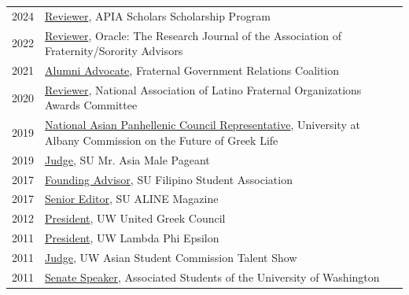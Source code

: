 \documentclass[12pt]{article}
\begin{document}
{\begin{longtable}{R{0.75in}p{5.0in}}
\footnotesize{2024} & \href{https://apiascholars.org/}{Reviewer}, APIA Scholars Scholarship Program\\

\footnotesize{2022} & \href{https://scholarworks.wm.edu/oracle/editorialboard.html}{Reviewer}, Oracle: The Research Journal of the Association of Fraternity/Sorority Advisors\\

\footnotesize{2021} & 
\href{http://www.fgrc.com/}{Alumni Advocate}, Fraternal Government Relations Coalition\\

\footnotesize{2020} & 
\href{https://nalfo.org/nalfo-awards/}{Reviewer}, National Association of Latino Fraternal Organizations Awards Committee\\

\footnotesize{2019} & 
\href{https://www.albany.edu/studentaffairs/commission_members.shtml}{National Asian Panhellenic Council Representative}, University at Albany Commission on the Future of Greek Life\\

\footnotesize{2019} & 
\href{https://ese.syr.edu/multicultural/calendar/asian-american-and-pacific-islander-heritage-month/}{Judge}, SU Mr. Asia Male Pageant\\

\footnotesize{2017} & 
 \href{https://www.facebook.com/syracusefsa/}{Founding Advisor}, SU Filipino Student Association\\

\footnotesize{2017} & \href{https://web.archive.org/web/20241207175640/https://issuu.com/alinemagazine}{Senior Editor}, SU ALINE Magazine\\

\footnotesize{2012} & \href{https://www.fiuts.org/blog/2020/4/1/stepping-to-build-community}{President}, UW United Greek Council\\

\footnotesize{2011} & \href{https://uwlambdas.com/}{President}, UW Lambda Phi Epsilon\\

\footnotesize{2011} & \href{https://www.facebook.com/events/972221256174460/}{Judge}, UW Asian Student Commission Talent Show\\

\footnotesize{2011} & \href{https://www.dailyuw.com/news/article_da48b049-d2a0-582c-9dfb-4589755ff1e5.html}{Senate Speaker}, Associated Students of the University of Washington\\


\end{longtable}}
\end{document}
